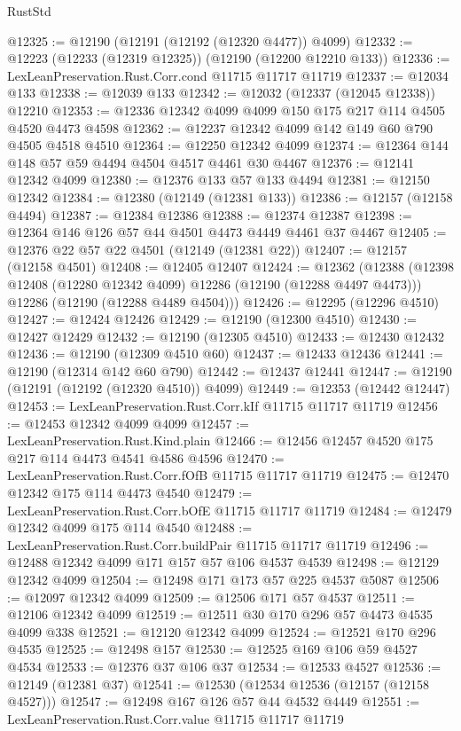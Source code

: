 \begin{lexlean}{RustStd}
\begin{coremodule}
@12325 := @12190 (@12191 (@12192 (@12320 @4477)) @4099)
@12332 := @12223 (@12233 (@12319 @12325)) (@12190 (@12200 @12210 @133))
@12336 := LexLeanPreservation.Rust.Corr.cond @11715 @11717 @11719
@12337 := @12034 @133
@12338 := @12039 @133
@12342 := @12032 (@12337 (@12045 @12338)) @12210
@12353 := @12336 @12342 @4099 @4099 @150 @175 @217 @114 @4505 @4520 @4473 @4598
@12362 := @12237 @12342 @4099 @142 @149 @60 @790 @4505 @4518 @4510
@12364 := @12250 @12342 @4099
@12374 := @12364 @144 @148 @57 @59 @4494 @4504 @4517 @4461 @30 @4467
@12376 := @12141 @12342 @4099
@12380 := @12376 @133 @57 @133 @4494
@12381 := @12150 @12342
@12384 := @12380 (@12149 (@12381 @133))
@12386 := @12157 (@12158 @4494)
@12387 := @12384 @12386
@12388 := @12374 @12387
@12398 := @12364 @146 @126 @57 @44 @4501 @4473 @4449 @4461 @37 @4467
@12405 := @12376 @22 @57 @22 @4501 (@12149 (@12381 @22))
@12407 := @12157 (@12158 @4501)
@12408 := @12405 @12407
@12424 := @12362
    (@12388
      (@12398 @12408 (@12280 @12342 @4099) @12286 (@12190 (@12288 @4497 @4473)))
      @12286
      (@12190 (@12288 @4489 @4504)))
@12426 := @12295 (@12296 @4510)
@12427 := @12424 @12426
@12429 := @12190 (@12300 @4510)
@12430 := @12427 @12429
@12432 := @12190 (@12305 @4510)
@12433 := @12430 @12432
@12436 := @12190 (@12309 @4510 @60)
@12437 := @12433 @12436
@12441 := @12190 (@12314 @142 @60 @790)
@12442 := @12437 @12441
@12447 := @12190 (@12191 (@12192 (@12320 @4510)) @4099)
@12449 := @12353 (@12442 @12447)
@12453 := LexLeanPreservation.Rust.Corr.kIf @11715 @11717 @11719
@12456 := @12453 @12342 @4099 @4099
@12457 := LexLeanPreservation.Rust.Kind.plain
@12466 := @12456 @12457 @4520 @175 @217 @114 @4473 @4541 @4586 @4596
@12470 := LexLeanPreservation.Rust.Corr.fOfB @11715 @11717 @11719
@12475 := @12470 @12342 @175 @114 @4473 @4540
@12479 := LexLeanPreservation.Rust.Corr.bOfE @11715 @11717 @11719
@12484 := @12479 @12342 @4099 @175 @114 @4540
@12488 := LexLeanPreservation.Rust.Corr.buildPair @11715 @11717 @11719
@12496 := @12488 @12342 @4099 @171 @157 @57 @106 @4537 @4539
@12498 := @12129 @12342 @4099
@12504 := @12498 @171 @173 @57 @225 @4537 @5087
@12506 := @12097 @12342 @4099
@12509 := @12506 @171 @57 @4537
@12511 := @12106 @12342 @4099
@12519 := @12511 @30 @170 @296 @57 @4473 @4535 @4099 @338
@12521 := @12120 @12342 @4099
@12524 := @12521 @170 @296 @4535
@12525 := @12498 @157
@12530 := @12525 @169 @106 @59 @4527 @4534
@12533 := @12376 @37 @106 @37
@12534 := @12533 @4527
@12536 := @12149 (@12381 @37)
@12541 := @12530 (@12534 @12536 (@12157 (@12158 @4527)))
@12547 := @12498 @167 @126 @57 @44 @4532 @4449
@12551 := LexLeanPreservation.Rust.Corr.value @11715 @11717 @11719

\end{coremodule}
\end{lexlean}

